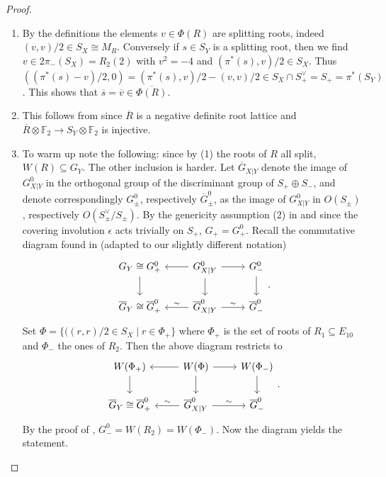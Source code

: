 \documentclass{amsart}
\theoremstyle{definition}
\theoremstyle{plain}
\newcommand{\FF}{\mathbb{F}}
\newcommand{\Gbar}{\overline{G}}
\begin{document}
\begin{proof}\hfill
\begin{enumerate}
    \item By the definitions the elements $v \in \Phi(R)$ are splitting roots, indeed $(v,v)/2 \in S_X\cong M_R$.
    Conversely if $s \in S_Y$ is a splitting root, then we find $v \in 2\pi_-(S_X)=R_2(2)$ with $v^2=-4$ and $(\pi^*(s),v)/2 \in S_X$.
    Thus $((\pi^*(s)-v)/2,0)=(\pi^*(s),v)/2 - (v,v)/2 \in S_X \cap S_+^\vee=S_+=\pi^*(S_Y)$. This shows that $\overline{s}=\overline{v} \in \overline{\Phi(R)}$.
    \item This follows from \cite[Lemma 3.8]{brandhorst_shimada:tautaubar} since $\overline{R}$ is a negative definite root lattice and $\overline{R} \otimes \FF_2 \to S_Y \otimes \FF_2$ is injective.

    \item To warm up note the following: since by (1) the roots of $R$ all split, $W(R) \subseteq G_Y$.
    The other inclusion is harder.
    Let $\Gbar_{X|Y}$ denote the image of $G_{X|Y}^0$ in the orthogonal group of the discriminant group of $S_+ \oplus S_-$, and denote correspondingly $G_{\pm}^0$, respectively $\Gbar_{\pm}^0$, as the image of $G_{X|Y}^0$ in $O(S_\pm)$, respectively $O(S_\pm^\vee/S_\pm)$.
    By the genericity assumption (2) in  and since the covering involution $\epsilon$ acts trivially on $S_+$, $G_+ = G_+^0$.
    Recall the commutative diagram found in \cite[equation (3.4)]{brandhorst_shimada:tautaubar} (adapted to our slightly different notation)
    \[
    \begin{tikzcd}
        G_Y \cong G_{+}^0 \arrow[d] &G_{X|Y}^0 \arrow[l]\arrow[r]\arrow[d] & G_{-}^0 \arrow[d]\\
        \Gbar_Y \cong \Gbar_{+}^0  &\Gbar_{X|Y}^0\arrow[l,"\sim"'] \arrow[r]{}{\sim} & \Gbar_{-}^0
    \end{tikzcd}.
    \]
    Set \(\Phi=\{((r,r)/2 \in S_X \mid r \in \Phi_+\}\) where
    $\Phi_+$ is the set of roots of $R_1\subseteq E_{10}$ and $\Phi_-$ the ones of $R_2$.
    Then the above diagram restricts to
    \[
    \begin{tikzcd}
        W(\Phi_+) \arrow[d] &W(\Phi) \arrow[l]\arrow[r]\arrow[d] & W(\Phi_-) \arrow[d]\\
        \Gbar_Y\cong\Gbar_{+}^0  &\Gbar_{X|Y}^0\arrow[l,"\sim"'] \arrow[r]{}{\sim} & \Gbar_{-}^0
    \end{tikzcd}.
    \]
    By the proof of \cite[Theorem 3.11]{brandhorst_shimada:tautaubar}, $G_{-}^0 = W(R_2)=W(\Phi_-)$. Now the diagram yields the statement.
\end{enumerate}
\end{proof}
\end{document}
